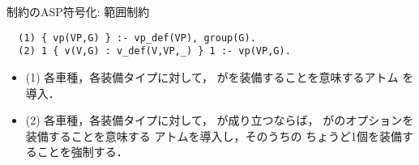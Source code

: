 \documentclass[dvipdfmx, 11pt]{beamer}
\begin{document}
\begin{frame}[fragile]{制約のASP符号化: 範囲制約}
 \begin{center} 
 \end{center}

\vfill
\begin{exampleblock}{}
\begin{lstlisting}
  (1) { vp(VP,G) } :- vp_def(VP), group(G). 
  (2) 1 { v(V,G) : v_def(V,VP,_) } 1 :- vp(VP,G).
\end{lstlisting}
\end{exampleblock}
\vfill
\begin{itemize}
\item (1)
  各車種，各装備タイプに対して，
  がを装備することを意味するアトム
  を導入．
\item (2)
  各車種，各装備タイプに対して，
  が成り立つならば，
  がのオプションを装備することを意味する
  アトムを導入し，そのうちの
  ちょうど1個を装備することを強制する．
\end{itemize}
\end{frame}
\end{document}
